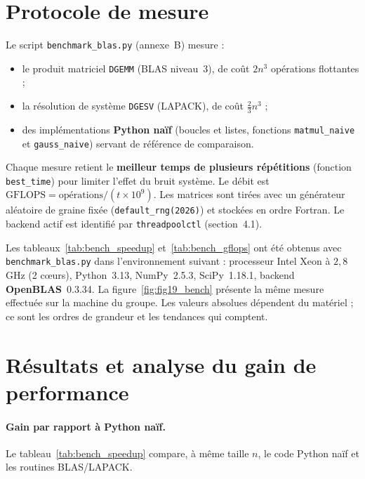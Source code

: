 \documentclass[11pt,a4paper]{report}
\theoremstyle{plain}
\theoremstyle{definition}
\theoremstyle{remark}
\begin{document}
\section{Protocole de mesure}

Le script \texttt{benchmark\_blas.py} (annexe~B) mesure :
\begin{itemize}
    \item le produit matriciel \texttt{DGEMM} (BLAS niveau~3), de coût $2n^3$ opérations flottantes ;
    \item la résolution de système \texttt{DGESV} (LAPACK), de coût $\frac23n^3$ ;
    \item des implémentations \textbf{Python naïf} (boucles et listes, fonctions \texttt{matmul\_naive} et \texttt{gauss\_naive}) servant de référence de comparaison.
\end{itemize}
Chaque mesure retient le \textbf{meilleur temps de plusieurs répétitions} (fonction \texttt{best\_time}) pour limiter l'effet du bruit système. Le débit est $\mathrm{GFLOPS}=\text{opérations}/(t\times10^9)$. Les matrices sont tirées avec un générateur aléatoire de graine fixée (\texttt{default\_rng(2026)}) et stockées en ordre Fortran. Le backend actif est identifié par \texttt{threadpoolctl} (section~4.1).

\begin{encadreattention}
Les tableaux~\ref{tab:bench_speedup} et~\ref{tab:bench_gflops} ont été obtenus avec \texttt{benchmark\_blas.py} dans l'environnement suivant : processeur Intel Xeon à $2{,}8$ GHz (2 cœurs), Python~3.13, NumPy~2.5.3, SciPy~1.18.1, backend \textbf{OpenBLAS}~0.3.34. La figure~\ref{fig:fig19_bench} présente la même mesure effectuée sur la machine du groupe. Les valeurs absolues dépendent du matériel ; ce sont les ordres de grandeur et les tendances qui comptent.
\end{encadreattention}

\section{Résultats et analyse du gain de performance}

\paragraph{Gain par rapport à Python naïf.} Le tableau~\ref{tab:bench_speedup} compare, à même taille $n$, le code Python naïf et les routines BLAS/LAPACK.
\end{document}
